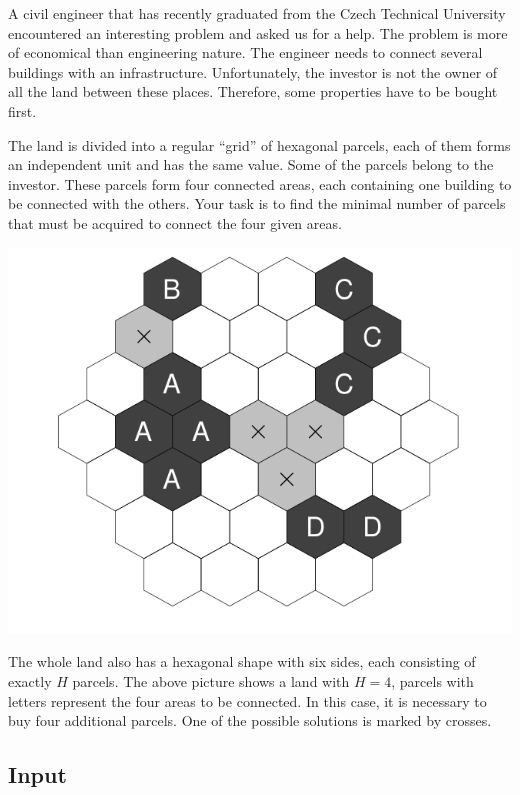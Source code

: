A civil engineer that has recently graduated from the Czech Technical
University encountered an interesting problem and asked us for a help. The
problem is more of economical than engineering nature. The engineer needs to
connect several buildings with an infrastructure. Unfortunately, the
investor is not the owner of all the land between these places. Therefore,
some properties have to be bought first.

The land is divided into a regular ``grid'' of hexagonal parcels, each of
them forms an independent unit and has the same value. Some of the parcels
belong to the investor. These parcels form four connected areas, each
containing one building to be connected with the others. Your task is to
find the minimal number of parcels that must be acquired to connect the four
given areas.

\begin{center}
\includegraphics[scale=0.3]{problems/hexagonal/imagens/hex.png}
\end{center}

The whole land also has a hexagonal shape with six sides, each consisting of
exactly $H$ parcels. The above picture shows a land with $H = 4$, parcels
with letters represent the four areas to be connected. In this case, it is
necessary to buy four additional parcels. One of the possible solutions is
marked by crosses.

\subsection*{Input}

